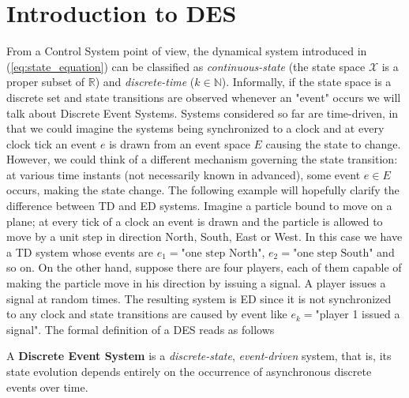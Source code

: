 \section{Introduction to DES }\label{sec:Introduction_to_DES}
From a Control System point of view, the dynamical system introduced in (\ref{eq:state_equation}) can be classified as \textit{continuous-state} (the state space $\mathcal{X}$ is a proper subset of $\mathbb{R}$) and \textit{discrete-time} ($k \in \mathbb{N}$). Informally, if the state space is a discrete set and state transitions are observed whenever an "event" occurs we will talk about Discrete Event Systems. Systems considered so far are time-driven, in that we could imagine the systems being synchronized to a clock and at every clock tick an event $e$ is drawn from an event space $E$ causing the state to change. However, we could think of a different mechanism governing the state transition: at various time instants (not necessarily known in advanced), some event $e \in E$ occurs, making the state change.
The following example will hopefully clarify the difference between \gls{TD} and \gls{ED} systems. Imagine a particle bound to move on a plane; at every tick of a clock an event is drawn and the particle is allowed to move by a unit step in direction North, South, East or West. In this case we have a \gls{TD} system whose events are $e_1= \text{"one step North"}$, $e_2= \text{"one step South"}$ and so on. On the other hand, suppose there are four players, each of them capable of making the particle move in his direction by issuing a signal. A player issues a signal at random times. The resulting system is \gls{ED} since it is not synchronized to any clock and state transitions are caused by event like $e_k=$"player 1 issued a signal". The formal definition of a \gls{DES} reads as follows
\begin{definition}
	A \textbf{Discrete Event System} is a \textit{discrete-state}, \textit{event-driven} system, that is, its state evolution depends entirely on the occurrence of asynchronous discrete events over time.
\end{definition} 


